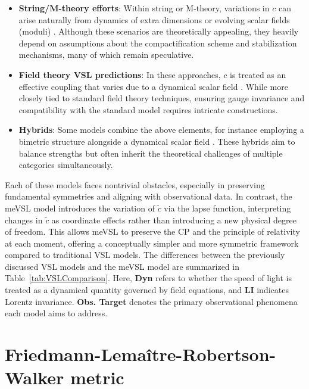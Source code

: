 \documentclass[jkps,preprint,fleqn]{revtex4} %
\newcommand{\tc}{\tilde{c}}
\begin{document}
\begin{itemize}
  \item \textbf{String/M-theory efforts}:  
    Within string or M-theory, variations in $c$ can arise naturally from dynamics of extra dimensions or evolving scalar fields (moduli) \cite{Kaelbermann:1998hu,Randall:1999ee,Randall:1999vf,Kiritsis:1999tx,Chung:1999xg,Alexander:1999cb,Ishihara:2000nf,Csaki:2000dm,Youm:2001sw,Youm:2001zk,Grojean:2001pv,Youm:2001zp}.  
    Although these scenarios are theoretically appealing, they heavily depend on assumptions about the compactification scheme and stabilization mechanisms, many of which remain speculative.
   \item \textbf{Field theory VSL predictions}:  
    In these approaches, $c$ is treated as an effective coupling that varies due to a dynamical scalar field \cite{Drummond:1979pp,Novello:1988ma,Barton:1989dq,Scharnhorst:1990sr,Shore:1995fz,Colladay:1995qb,Coleman:1998ti,Bertolami:1999da,Shore:2000bs,Greenberg:2002uu,Teyssandier:2003qh,Shore:2003zc,Blasone:2003wf}.  
    While more closely tied to standard field theory techniques, ensuring gauge invariance and compatibility with the standard model requires intricate constructions.
    \item \textbf{Hybrids}:  
    Some models combine the above elements, for instance employing a bimetric structure alongside a dynamical scalar field  \cite{Alexander:2001dr,Burgess:2002tb}.  
    These hybrids aim to balance strengths but often inherit the theoretical challenges of multiple categories simultaneously.
\end{itemize}

Each of these models faces nontrivial obstacles, especially in preserving fundamental symmetries and aligning with observational data.  
In contrast, the meVSL model introduces the variation of $\tc$ via the lapse function, interpreting changes in $\tc$ as coordinate effects rather than introducing a new physical degree of freedom.  
This allows meVSL to preserve the CP and the principle of relativity at each moment, offering a conceptually simpler and more symmetric framework compared to traditional VSL models. The differences between the previously discussed VSL models and the meVSL model are summarized in Table~\ref{tab:VSLComparison}.  Here, \textbf{Dyn} refers to whether the speed of light is treated as a dynamical quantity governed by field equations, and \textbf{LI} indicates Lorentz invariance. \textbf{Obs. Target} denotes the primary observational phenomena each model aims to address.

\section{Friedmann-Lemaître-Robertson-Walker metric}
\label{sec:RWm}
\end{document}
